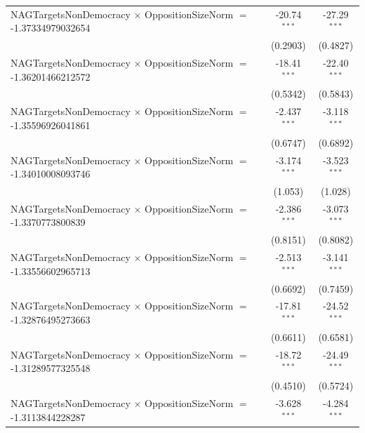 \begin{tabular}{lcc}
   NAGTargetsNonDemocracy $\times$ OppositionSizeNorm $=$ -1.37334979032654     & -20.74$^{***}$       & -27.29$^{***}$\\   
                                                                                & (0.2903)             & (0.4827)\\   
   NAGTargetsNonDemocracy $\times$ OppositionSizeNorm $=$ -1.36201466212572     & -18.41$^{***}$       & -22.40$^{***}$\\   
                                                                                & (0.5342)             & (0.5843)\\   
   NAGTargetsNonDemocracy $\times$ OppositionSizeNorm $=$ -1.35596926041861     & -2.437$^{***}$       & -3.118$^{***}$\\   
                                                                                & (0.6747)             & (0.6892)\\   
   NAGTargetsNonDemocracy $\times$ OppositionSizeNorm $=$ -1.34010008093746     & -3.174$^{***}$       & -3.523$^{***}$\\   
                                                                                & (1.053)              & (1.028)\\   
   NAGTargetsNonDemocracy $\times$ OppositionSizeNorm $=$ -1.3370773800839      & -2.386$^{***}$       & -3.073$^{***}$\\   
                                                                                & (0.8151)             & (0.8082)\\   
   NAGTargetsNonDemocracy $\times$ OppositionSizeNorm $=$ -1.33556602965713     & -2.513$^{***}$       & -3.141$^{***}$\\   
                                                                                & (0.6692)             & (0.7459)\\   
   NAGTargetsNonDemocracy $\times$ OppositionSizeNorm $=$ -1.32876495273663     & -17.81$^{***}$       & -24.52$^{***}$\\   
                                                                                & (0.6611)             & (0.6581)\\   
   NAGTargetsNonDemocracy $\times$ OppositionSizeNorm $=$ -1.31289577325548     & -18.72$^{***}$       & -24.49$^{***}$\\   
                                                                                & (0.4510)             & (0.5724)\\   
   NAGTargetsNonDemocracy $\times$ OppositionSizeNorm $=$ -1.3113844228287      & -3.628$^{***}$       & -4.284$^{***}$\\   

\end{tabular}
